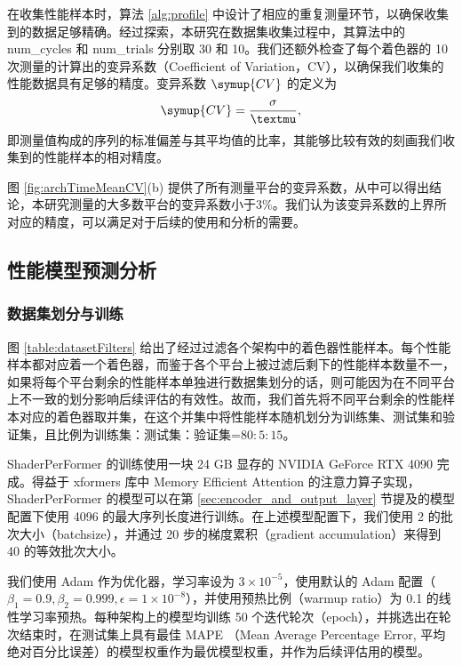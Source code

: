 在收集性能样本时，算法 \ref{alg:profile} 中设计了相应的重复测量环节，以确保收集到的数据足够精确。经过探索，本研究在数据集收集过程中，其算法中的 {num\_cycles} 和 {num\_trials} 分别取 30 和 10。我们还额外检查了每个着色器的 10 次测量的计算出的变异系数（Coefficient of Variation，CV），以确保我们收集的性能数据具有足够的精度。变异系数 $ \symup{CV} $ 的定义为
$$
\symup{CV} = \frac{\sigma}{\mu},
$$
即测量值构成的序列的标准偏差与其平均值的比率，其能够比较有效的刻画我们收集到的性能样本的相对精度。

图 \ref{fig:archTimeMeanCV}(b) 提供了所有测量平台的变异系数，从中可以得出结论，本研究测量的大多数平台的变异系数小于$3\%$。我们认为该变异系数的上界所对应的精度，可以满足对于后续的使用和分析的需要。

\subsection{性能模型预测分析}

\subsubsection{数据集划分与训练}

\label{sec:training}

图 \ref{table:datasetFilters} 给出了经过过滤各个架构中的着色器性能样本。每个性能样本都对应着一个着色器，而鉴于各个平台上被过滤后剩下的性能样本数量不一，如果将每个平台剩余的性能样本单独进行数据集划分的话，则可能因为在不同平台上不一致的划分影响后续评估的有效性。故而，我们首先将不同平台剩余的性能样本对应的着色器取并集，在这个并集中将性能样本随机划分为训练集、测试集和验证集，且比例为训练集：测试集：验证集=$80:5:15$。

ShaderPerFormer 的训练使用一块 24 GB 显存的 NVIDIA GeForce RTX 4090 完成。得益于 xformers \cite{xFormers2022}库中 Memory Efficient Attention 的注意力算子实现\cite{rabe2022selfattention}，ShaderPerFormer 的模型可以在第 \ref{sec:encoder_and_output_layer} 节提及的模型配置下使用 4096 的最大序列长度进行训练。在上述模型配置下，我们使用 2 的批次大小（batchsize），并通过 20 步的梯度累积（gradient accumulation）来得到 40 的等效批次大小。

我们使用 Adam \cite{Kingma2014AdamAM} 作为优化器，学习率设为 $3 \times 10^{-5}$，使用默认的 Adam 配置（$\beta_1=0.9, \beta_2=0.999, \epsilon=1 \times 10^{-8}$），并使用预热比例（warmup ratio）为 0.1 的线性学习率预热。每种架构上的模型均训练 50 个迭代轮次（epoch），并挑选出在轮次结束时，在测试集上具有最佳 MAPE （Mean Average Percentage Error, 平均绝对百分比误差）的模型权重作为最优模型权重，并作为后续评估用的模型。

